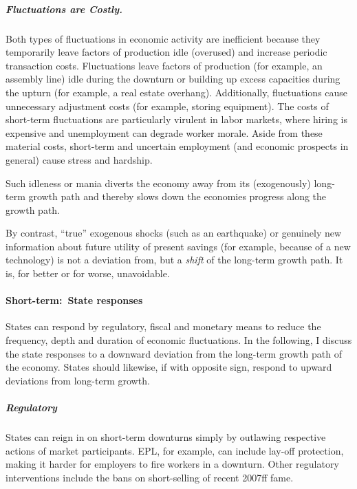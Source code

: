 \subparagraph{Fluctuations are Costly.} Both types of fluctuations in economic activity are inefficient because they temporarily leave factors of production idle (overused) and increase periodic transaction costs.
Fluctuations leave factors of production (for example, an assembly line) idle during the downturn or building up excess capacities during the upturn (for example, a real estate overhang).
Additionally, fluctuations cause unnecessary adjustment costs (for example, storing equipment).
The costs of short-term fluctuations are particularly virulent in labor markets, where hiring is expensive and unemployment can degrade worker morale.
Aside from these material costs, short-term and uncertain employment (and economic prospects in general) cause stress and hardship.

Such idleness or mania diverts the economy away from its (exogenously) long-term growth path and thereby slows down the economies progress along the growth path.

By contrast, ``true'' exogenous shocks (such as an earthquake) or genuinely new information about future utility of present savings (for example, because of a new technology) is not a deviation from, but a \emph{shift} of the long-term growth path.
It is, for better or for worse, unavoidable.

\paragraph{Short-term:~State responses}
States can respond by regulatory, fiscal and monetary means to reduce the frequency, depth and duration of economic fluctuations.
In the following, I discuss the state responses to a downward deviation from the long-term growth path of the economy.
States should likewise, if with opposite sign, respond to upward deviations from long-term growth.

\subparagraph{Regulatory}
States can reign in on short-term downturns simply by outlawing respective actions of market participants.
\gls{EPL}, for example, can include lay-off protection, making it harder for employers to fire workers in a downturn.
Other regulatory interventions include the bans on short-selling of recent 2007ff fame.

